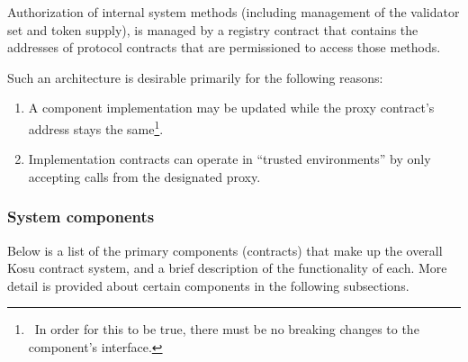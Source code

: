 \documentclass[10pt]{article}
\begin{document}
Authorization of internal system methods (including management of the validator set and token supply), is managed by a registry contract that contains the addresses of protocol contracts that are permissioned to access those methods.
\medskip

Such an architecture is desirable primarily for the following reasons:

\begin{enumerate}
  \item A component implementation may be updated while the proxy contract's address stays the same\footnote{\ In order for this to be true, there must be no breaking changes to the component's interface.}.
  \item Implementation contracts can operate in ``trusted environments'' by only accepting calls from the designated proxy.
\end{enumerate}

\subsubsection{System components}\label{ethereum-contract-system-components}
Below is a list of the primary components (contracts) that make up the overall Kosu contract system, and a brief description of the functionality of each. More detail is provided about certain components in the following subsections.
\end{document}
